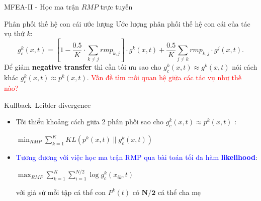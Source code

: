 	\begin{frame}{MFEA-II - Học ma trận $RMP$ trực tuyến}
		\begin{itemize}
		    \begin{block}{Phân phối thế hệ con cái ước lượng}
                Ước lượng phân phối thế hệ con cái của tác vụ thứ $k$:
                \begin{equation}
                    g_c^k(x,t) = [1 - \frac{0.5}{K}\cdot \sum_{k \neq j}rmp_{k,j}] \cdot g^k(x,t) + \frac{0.5}{K} \sum_{j \neq k} rmp_{k,j} \cdot g^j(x,t).
                    \label{equa:true_distribution}
                \end{equation}
                \Rightarrow Để giảm \textbf{negative transfer} thì cần tối ưu sao cho $g_c^k(x,t) \approx g^k(x,t)$ nói cách khác $g_c^k(x,t) \approx p^k(x,t)$. \textcolor{red}{Vấn đề tìm mối quan hệ giữa các tác vụ như thế nào?}
			\end{block}\pause
			\begin{block}{Kullback–Leibler divergence}
                \begin{itemize}
                    \setlength\itemsep{0.01em}
                    \item Tối thiểu khoảng cách giữa 2 phân phối sao cho $g_c^k(x,t) \approx p^k(x,t)$ :
                    \begin{center}
                        $\min_{RMP}\sum_{k=1}^K{KL(p^k(x,t)\|g_c^k(x,t))}
                        \label{equa:minimize_KL}$
                    \end{center}
                    \item \textcolor{blue}{Tương đương với việc học ma trận RMP qua bài toán tối đa hàm \textbf{likelihood}}:
                    \begin{center}
                        $\max_{RMP}\sum_{k=1}^{K}\sum_{i=1}^{N/2}\log{g_c^k(x_{ik},t)}
                        \label{equa:likelihood}$
                    \end{center}
                 với giả sử mỗi tập cá thể con $P^k(t)$ có $\mathbf{N/2}$ cá thể cha mẹ
                \end{itemize}
			\end{block}
		\end{itemize}
	\end{frame}
